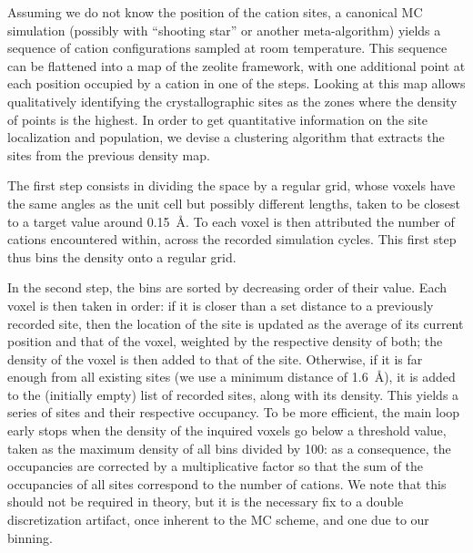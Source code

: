 \documentclass[main.tex]{subfiles}
\begin{document}

Assuming we do not know the position of the cation sites, a canonical MC simulation (possibly with ``shooting star'' or another meta-algorithm) yields a sequence of cation configurations sampled at room temperature. This sequence can be flattened into a map of the zeolite framework, with one additional point at each position occupied by a cation in one of the steps. Looking at this map allows qualitatively identifying the crystallographic sites as the zones where the density of points is the highest. In order to get quantitative information on the site localization and population, we devise a clustering algorithm that extracts the sites from the previous density map.

The first step consists in dividing the space by a regular grid, whose voxels have the same angles as the unit cell but possibly different lengths, taken to be closest to a target value around \qty{0.15}{\angstrom}. To each voxel is then attributed the number of cations encountered within, across the recorded simulation cycles. This first step thus bins the density onto a regular grid.

In the second step, the bins are sorted by decreasing order of their value. Each voxel is then taken in order: if it is closer than a set distance to a previously recorded site, then the location of the site is updated as the average of its current position and that of the voxel, weighted by the respective density of both; the density of the voxel is then added to that of the site. Otherwise, if it is far enough from all existing sites (we use a minimum distance of \qty{1.6}{\angstrom}), it is added to the (initially empty) list of recorded sites, along with its density. This yields a series of sites and their respective occupancy. To be more efficient, the main loop early stops when the density of the inquired voxels go below a threshold value, taken as the maximum density of all bins divided by 100: as a consequence, the occupancies are corrected by a multiplicative factor so that the sum of the occupancies of all sites correspond to the number of cations. We note that this should not be required in theory, but it is the necessary fix to a double discretization artifact, once inherent to the MC scheme, and one due to our binning.
\end{document}
